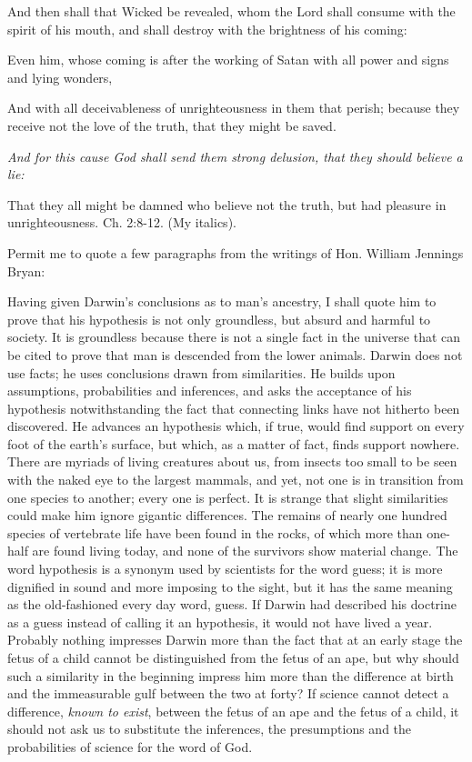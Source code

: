 And then shall that Wicked be revealed, whom the Lord shall consume with the spirit of his
mouth, and shall destroy with the brightness of his coming:

Even him, whose coming is after the working of Satan with all power and signs and lying
wonders,

And with all deceivableness of unrighteousness in them that perish; because they receive not
the love of the truth, that they might be saved.

\textit{And for this cause God shall send them strong delusion, that they should believe a lie:}

That they all might be damned who believe not the truth, but had pleasure in
unrighteousness. Ch. 2:8-12. (My italics).

Permit me to quote a few paragraphs from the writings of Hon. William Jennings Bryan:

Having given Darwin's conclusions as to man's ancestry, I shall quote him to prove that his
hypothesis is not only groundless, but absurd and harmful to society. It is groundless because
there is not a single fact in the universe that can be cited to prove that man is descended from
the lower animals. Darwin does not use facts; he uses conclusions drawn from similarities.
He builds upon assumptions, probabilities and inferences, and asks the acceptance of his
hypothesis notwithstanding the fact that connecting links have not hitherto been discovered.
He advances an hypothesis which, if true, would find support on every foot of the earth's
surface, but which, as a matter of fact, finds support nowhere. There are myriads of living
creatures about us, from insects too small to be seen with the naked eye to the largest
mammals, and yet, not one is in transition from one species to another; every one is perfect.
It is strange that slight similarities could make him ignore gigantic differences. The remains
of nearly one hundred species of vertebrate life have been found in the rocks, of which more
than one-half are found living today, and none of the survivors show material change. The
word hypothesis is a synonym used by scientists for the word guess; it is more dignified in
sound and more imposing to the sight, but it has the same meaning as the old-fashioned every
day word, guess. If Darwin had described his doctrine as a guess instead of calling it an
hypothesis, it would not have lived a year. Probably nothing impresses Darwin more than the
fact that at an early stage the fetus of a child cannot be distinguished from the fetus of an ape,
but why should such a similarity in the beginning impress him more than the difference at
birth and the immeasurable gulf between the two at forty? If science cannot detect a
difference, \textit{known to exist}, between the fetus of an ape and the fetus of a child, it should not
ask us to substitute the inferences, the presumptions and the probabilities of science for the
word of God.

